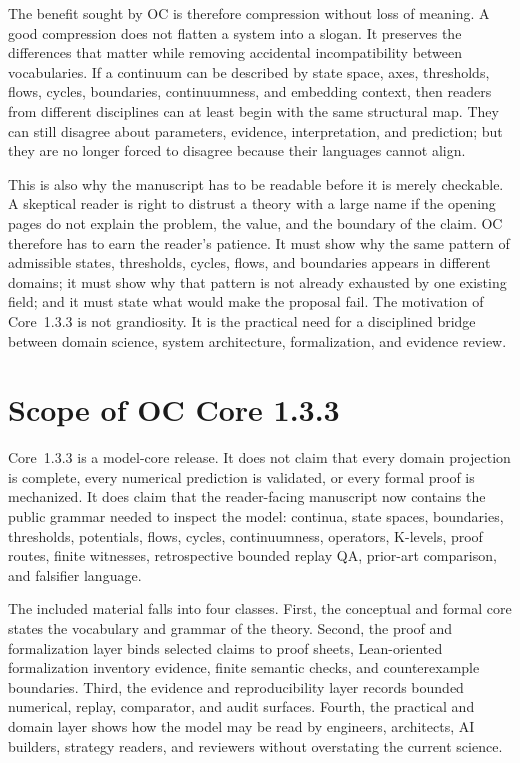 The benefit sought by OC is therefore compression without loss of meaning. A
good compression does not flatten a system into a slogan. It preserves the
differences that matter while removing accidental incompatibility between
vocabularies. If a continuum can be described by state space, axes, thresholds,
flows, cycles, boundaries, continuumness, and embedding context, then readers
from different disciplines can at least begin with the same structural map.
They can still disagree about parameters, evidence, interpretation, and
prediction; but they are no longer forced to disagree because their languages
cannot align.

This is also why the manuscript has to be readable before it is merely
checkable. A skeptical reader is right to distrust a theory with a large name if
the opening pages do not explain the problem, the value, and the boundary of
the claim. OC therefore has to earn the reader's patience. It must show why the
same pattern of admissible states, thresholds, cycles, flows, and boundaries
appears in different domains; it must show why that pattern is not already
exhausted by one existing field; and it must state what would make the proposal
fail. The motivation of Core~1.3.3 is not grandiosity. It is the practical need
for a disciplined bridge between domain science, system architecture,
formalization, and evidence review.

\section{Scope of OC Core 1.3.3}
\label{sec:r012-scope}

Core~1.3.3 is a model-core release. It does not claim that every domain
projection is complete, every numerical prediction is validated, or every
formal proof is mechanized. It does claim that the reader-facing manuscript now
contains the public grammar needed to inspect the model: continua, state
spaces, boundaries, thresholds, potentials, flows, cycles, continuumness,
operators, K-levels, proof routes, finite witnesses, retrospective bounded replay QA,
prior-art comparison, and falsifier language.

The included material falls into four classes. First, the conceptual and formal
core states the vocabulary and grammar of the theory. Second, the proof and
formalization layer binds selected claims to proof sheets, Lean-oriented formalization inventory evidence,
finite semantic checks, and counterexample boundaries. Third, the evidence and
reproducibility layer records bounded numerical, replay, comparator, and audit
surfaces. Fourth, the practical and domain layer shows how the model may be read
by engineers, architects, AI builders, strategy readers, and reviewers without
overstating the current science.


